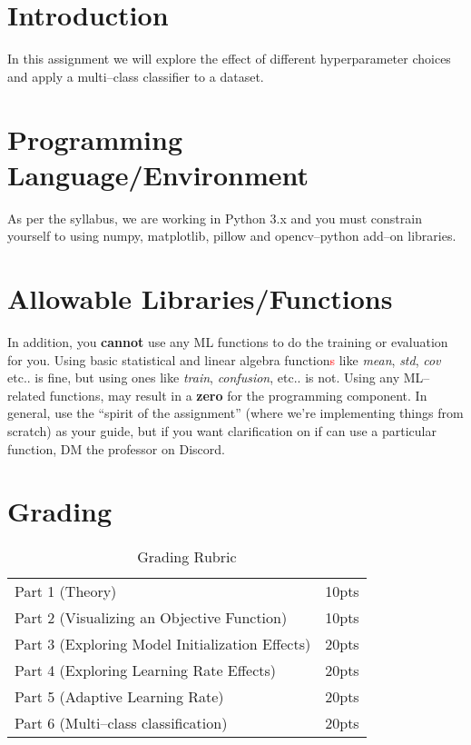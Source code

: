 \documentclass[12pt]{article}
\newcommand\red[1]{\textcolor{red}{#1}} %
\begin{document}
\maketitle


\section*{Introduction}
In this assignment we will explore the effect of different hyperparameter choices and apply a multi--class classifier to a dataset.\\

\section*{Programming Language/Environment}
As per the syllabus, we are working in Python 3.x and you must constrain yourself to using numpy, matplotlib, pillow and opencv--python add--on libraries.

\section*{Allowable Libraries/Functions}
In addition, you \textbf{cannot} use any ML functions to do the training or evaluation for you.  Using basic statistical and linear algebra function\red{s} like \emph{mean}, \emph{std}, \emph{cov} etc.. is fine, but using ones like \emph{train}, \emph{confusion}, etc.. is not. Using any ML--related functions, may result in a \textbf{zero} for the programming component.  In general, use the ``spirit of the assignment'' (where we're implementing things from scratch) as your guide, but if you want clarification on if can use a particular function, DM the professor on Discord.


\section*{Grading}
\begin{table}[h]
\begin{center}
\begin{tabular}{|l|l|}
\hline
Part 1 (Theory) & 10pts\\
Part 2 (Visualizing an Objective Function) & 10pts\\
Part 3 (Exploring Model Initialization Effects) & 20pts\\
Part 4 (Exploring Learning Rate Effects) & 20pts\\
Part 5 (Adaptive Learning Rate) & 20pts\\
Part 6 (Multi--class classification) & 20pts\\
\hline
\end{tabular}
\caption{Grading Rubric}
\end{center}
\end{table}
\end{document}
